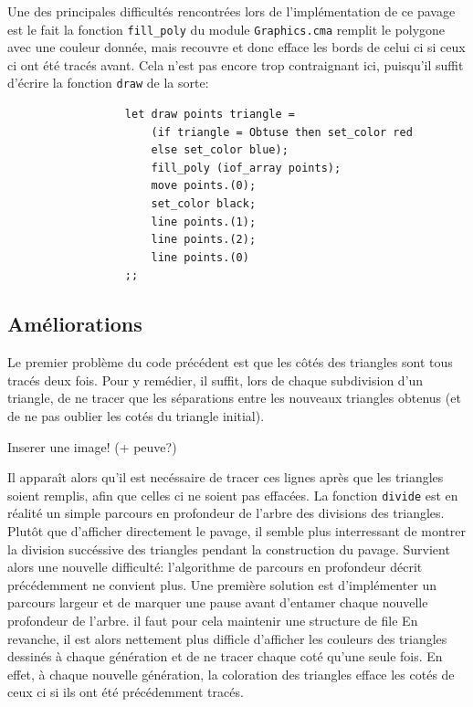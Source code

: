 \documentclass[a4paper, 11pt]{article}%
\begin{document}
                Une des principales difficultés rencontrées lors de
                l'implémentation de ce pavage est le fait la fonction
                \texttt{fill\_poly} du module \texttt{Graphics.cma}
                remplit le polygone avec une couleur donnée, mais
                recouvre et donc efface les bords de celui ci si ceux
                ci ont été tracés avant. Cela n'est pas encore trop
                contraignant ici, puisqu'il suffit d'écrire la
                fonction \texttt{draw} de la sorte:

                \begin{lstlisting}
                  let draw points triangle =
                      (if triangle = Obtuse then set_color red
                      else set_color blue);
                      fill_poly (iof_array points);
                      move points.(0);
                      set_color black;
                      line points.(1);  
                      line points.(2);
                      line points.(0)
                  ;;
                \end{lstlisting}
                
	\subsection{Améliorations}
		Le premier problème du code précédent est que les
                côtés des triangles sont tous tracés deux fois. Pour y
                remédier, il suffit, lors de chaque subdivision d'un
                triangle, de ne tracer que les séparations entre les
                nouveaux triangles obtenus (et de ne pas oublier les
                cotés du triangle initial).

		Inserer une image! (+ peuve?)

		Il apparaît alors qu'il est necéssaire de tracer ces
                lignes après que les triangles soient remplis, afin
                que celles ci ne soient pas effacées.
		La fonction \texttt{divide} est en réalité un simple
                parcours en profondeur de l'arbre des divisions des triangles.		
		Plutôt que d'afficher directement le pavage, il semble
                plus interressant de montrer la division succéssive
                des triangles pendant la construction du
                pavage. Survient alors une nouvelle difficulté:
                l'algorithme de parcours en profondeur décrit
                précédemment ne convient plus. 
		Une première solution est d'implémenter un parcours
                largeur et de marquer une pause avant d'entamer chaque
                nouvelle profondeur de l'arbre. il faut pour cela
                maintenir une structure de file   En revanche, il est
                alors nettement plus difficle d'afficher les couleurs
                des triangles dessinés à chaque génération et de ne
                tracer chaque coté qu'une seule fois. En effet, à
                chaque nouvelle génération, la coloration des
                triangles efface les cotés de ceux ci si ils ont été
                précédemment tracés. 
\end{document}
